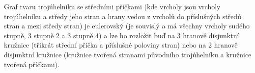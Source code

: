 \documentclass[12pt]{article}					%
\begin{document}
\begin{priklad}[1]
\begin{reseni}

        Graf tvaru trojúhelníku se středními příčkami (kde vrcholy jsou vrcholy trojúhelníku a středy jeho stran a hrany vedou z vrcholů do příslušných středů stran a mezi středy stran) je eulerovský (je souvislý a má všechny vrcholy sudého stupně, 3 stupně 2 a 3 stupně 4) a lze ho rozložit buď na 3 hranově disjunktní kružnice (třikrát střední příčka a příslušné poloviny stran) nebo na 2 hranově disjunktní kružnice (kružnice tvořená stranami původního trojúhelníku a kružnice tvořená příčkami).
    \end{reseni}
\end{priklad}

\pagebreak
\end{document}
